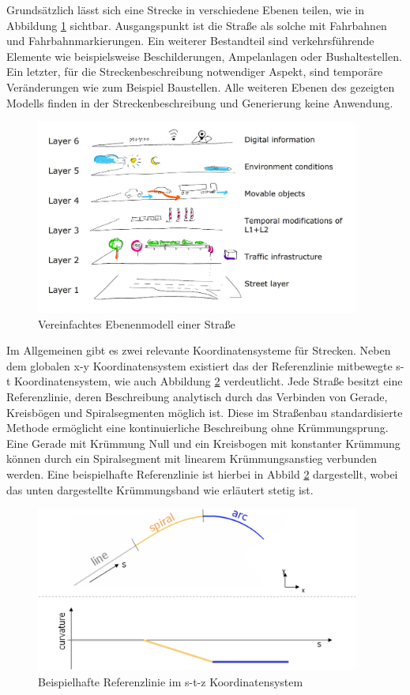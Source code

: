 Grundsätzlich lässt sich eine Strecke in verschiedene Ebenen teilen, wie in Abbildung \ref{abb1} sichtbar. Ausgangspunkt ist die Straße als solche mit Fahrbahnen und Fahrbahnmarkierungen. Ein weiterer Bestandteil sind verkehrsführende Elemente wie beispielsweise Beschilderungen, Ampelanlagen oder Bushaltestellen. Ein letzter, für die Streckenbeschreibung notwendiger Aspekt, sind temporäre Veränderungen wie zum Beispiel Baustellen. Alle weiteren Ebenen des gezeigten Modells finden in der Streckenbeschreibung und Generierung keine Anwendung.

\begin{figure}[H]
\flushleft
\includegraphics[width=0.95\textwidth]{fig/fig1.png}
\caption{Vereinfachtes Ebenenmodell einer Straße \cite{Eckstein.2018}}
\label{abb1}
\end{figure}

Im Allgemeinen gibt es zwei relevante Koordinatensysteme für Strecken. Neben dem globalen x-y Koordinatensystem existiert das der Referenzlinie mitbewegte s-t Koordinatensystem, wie auch Abbildung \ref{abb2} verdeutlicht. Jede Straße besitzt eine Referenzlinie, deren Beschreibung analytisch durch das Verbinden von Gerade, Kreisbögen und Spiralsegmenten möglich ist. Diese im Straßenbau standardisierte Methode ermöglicht eine kontinuierliche Beschreibung ohne Krümmungsprung. Eine Gerade mit Krümmung Null und ein Kreisbogen mit konstanter Krümmung können durch ein Spiralsegment mit linearem Krümmungsanstieg verbunden werden. Eine beispielhafte Referenzlinie ist hierbei in Abbild \ref{abb2} dargestellt, wobei das unten dargestellte Krümmungsband wie erläutert stetig ist.

\begin{figure}[H]
\flushleft
\includegraphics[width=0.95\textwidth]{fig/fig2.png}
\caption{Beispielhafte Referenzlinie im s-t-z Koordinatensystem \cite{Becker.2017}}
\label{abb2}
\end{figure}

